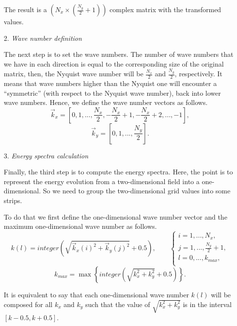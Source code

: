 \begin{itemize}
The result is a $\left(N_x\times\left(\frac{N_y}{2}+1\right)\right)$ complex matrix with the transformed values.

\item[2.]\textit{Wave number definition}

The next step is to set the wave numbers. The number of wave numbers that we have in each direction is equal to the corresponding size of the original matrix, then, the Nyquist wave number will be $\frac{N_x}{2}$ and $\frac{N_y}{2}$, respectively. It means that wave numbers higher than the Nyquist one will encounter a ``symmetric'' (with respect to the Nyquist wave number), back into lower wave numbers. Hence, we define the wave number vectors as follows.
\begin{equation}
\label{1.12.3}
\vec{k}_x=\left[0,1,...,\frac{N_x}{2},-\frac{N_x}{2}+1,-\frac{N_x}{2}+2,...,-1\right],
\end{equation}
\begin{equation}
\label{1.12.4}
\vec{k}_y=\left[0,1,...,\frac{N_y}{2}\right].
\end{equation}

\item[3.]\textit{Energy spectra calculation}

Finally, the third step is to compute the energy spectra. Here, the point is to represent the energy evolution from a two-dimensional field into a one-dimensional. So we need to group the two-dimensional grid values into some strips.

To do that we first define the one-dimensional wave number vector and the maximum one-dimensional wave number as follows.
\begin{equation}
\label{1.12.5}
k(l)=integer\left(\sqrt{\vec{k}_x(i)^2+\vec{k}_y(j)^2}+0.5\right),\quad\quad\left\{\begin{array}{l}
i=1,...,N_x,\\
j=1,...,\frac{N_y}{2}+1,\\
l=0,...,k_{max},\\
\end{array} \right.
\end{equation}
\begin{equation}
\label{1.12.6}
k_{max}=\max\left\{integer\left(\sqrt{k_x^2+k_y^2}+0.5\right)\right\}.
\end{equation}

It is equivalent to say that each one-dimensional wave number $k(l)$ will be composed for all $k_x$ and $k_y$ such that the value of $\sqrt{k_x^2+k_y^2}$ is in the interval $[k-0.5,k+0.5]$.


\end{itemize}

